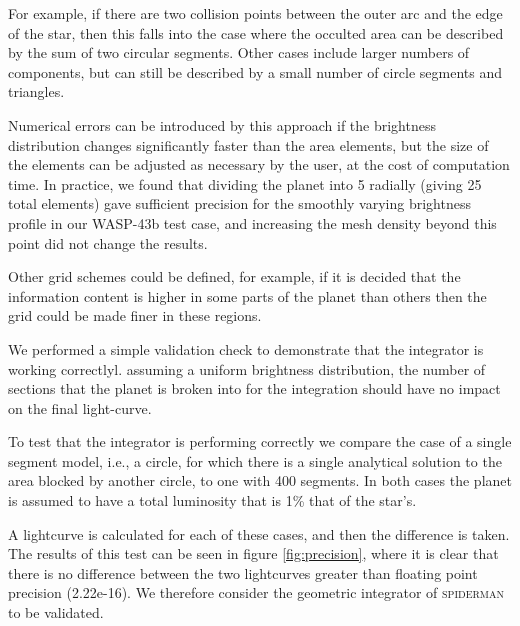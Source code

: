 \documentclass[a4paper,fleqn,usenatbib]{mnras}
\begin{document}
For example, if there are two collision points between the outer arc and the edge of the star, then this falls into the case where the occulted area can be described by the sum of two circular segments. Other cases include larger numbers of components, but can still be described by a small number of circle segments and triangles.

Numerical errors can be introduced by this approach if the brightness distribution changes significantly faster than the area elements, but the size of the elements can be adjusted as necessary by the user, at the cost of computation time.
In practice, we found that dividing the planet into 5 radially (giving 25 total elements) gave sufficient precision for the smoothly varying brightness profile in our WASP-43b test case, and increasing the mesh density beyond this point did not change the results.

Other grid schemes could be defined, for example, if it is decided that the information content is higher in some parts of the planet than others then the grid could be made finer in these regions.

We performed a simple validation check to demonstrate that the integrator is working correctlyl. assuming a uniform brightness distribution, the number of sections that the planet is broken into for the integration should have no impact on the final light-curve.

To test that the integrator is performing correctly we compare the case of a single segment model, i.e., a circle, for which there is a single analytical solution to the area blocked by another circle, to one with 400 segments. In both cases the planet is assumed to have a total luminosity that is 1\% that of the star's.

A lightcurve is calculated for each of these cases, and then the difference is taken. The results of this test can be seen in figure \ref{fig:precision}, where it is clear that there is no difference between the two lightcurves greater than floating point precision (2.22e-16). We therefore consider the geometric integrator of \textsc{spiderman} to be validated.
\end{document}
